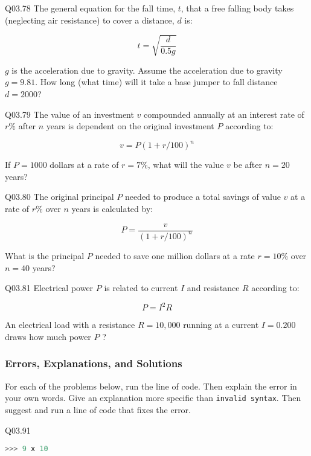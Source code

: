 \documentclass{book}
\newenvironment{problems}{}{}  %
\newcommand{\passthrough}[1]{#1}
\begin{document}
\begin{problems}
Q03.78 The general equation for the fall time, \(t\), that a free
falling body takes (neglecting air resistance) to cover a distance,
\(d\) is:

\[t = \sqrt{\frac{d}{0.5g}}\]

\(g\) is the acceleration due to gravity. Assume the acceleration due to
gravity \(g = 9.81\). How long (what time) will it take a base jumper to
fall distance \(d = 2000\)?

Q03.79 The value of an investment \(v\) compounded annually at an
interest rate of \(r\%\) after \(n\) years is dependent on the original
investment \(P\) according to:

\[ v = P(1 + r/100)^n \]

If \(P=1000\) dollars at a rate of \(r=7\%\), what will the value \(v\)
be after \(n=20\) years?

Q03.80 The original principal \(P\) needed to produce a total savings of
value \(v\) at a rate of \(r\%\) over \(n\) years is calculated by:

\[ P = \frac{v}{(1+r/100)^n} \]

What is the principal \(P\) needed to save one million dollars at a rate
\(r=10\%\) over \(n=40\) years?

Q03.81 Electrical power \(P\) is related to current \(I\) and resistance
\(R\) according to:

\[ P = I^2R\]

An electrical load with a resistance \(R = 10,000\) running at a current
\(I=0.200\) draws how much power \(P\) ?
        \end{problems}

    




    
        \hypertarget{errors-explanations-and-solutions}{%
\subsubsection{Errors, Explanations, and
Solutions}\label{errors-explanations-and-solutions}}

For each of the problems below, run the line of code. Then explain the
error in your own words. Give an explanation more specific than
\passthrough{\lstinline!invalid syntax!}. Then suggest and run a line of
code that fixes the error.

Q03.91

\begin{lstlisting}[language=Python]
>>> 9 x 10
\end{lstlisting}
\end{document}
